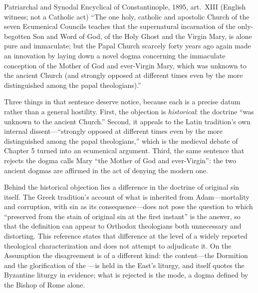 \begin{studybox}{Patriarchal and Synodal Encyclical of Constantinople,
1895, art.~XIII (English witness; not a Catholic act)}
``The one holy, catholic and apostolic Church of the seven Ecumenical
Councils teaches that the supernatural incarnation of the only-begotten
Son and Word of God, of the Holy Ghost and the Virgin Mary, is alone pure
and immaculate; but the Papal Church scarcely forty years ago again made
an innovation by laying down a novel dogma concerning the immaculate
conception of the Mother of God and ever-Virgin Mary, which was unknown
to the ancient Church (and strongly opposed at different times even by
the more distinguished among the papal theologians).''
\end{studybox}

Three things in that sentence deserve notice, because each is a precise
datum rather than a general hostility. First, the objection is
\emph{historical}: the doctrine ``was unknown to the ancient Church.''
Second, it appeals to the Latin tradition's own internal
dissent---``strongly opposed at different times even by the more
distinguished among the papal theologians,'' which is the medieval debate
of Chapter 5 turned into an ecumenical argument. Third, the same sentence
that rejects the dogma calls Mary ``the Mother of God and ever-Virgin'':
the two ancient dogmas are affirmed in the act of denying the modern one.

Behind the historical objection lies a difference in the doctrine of
original sin itself. The Greek tradition's account of what is inherited
from Adam---mortality and corruption, with sin as its consequence---does
not pose the question to which ``preserved from the stain of original
sin at the first instant'' is the answer, so that the definition can
appear to Orthodox theologians both unnecessary and distorting. This
reference states that difference at the level of a widely reported
theological characterization and does not attempt to adjudicate
it. On the Assumption the disagreement is of a
different kind: the content---the Dormition and the glorification of the
---is held in the East's liturgy, and  itself
quotes the Byzantine liturgy in evidence; what is rejected is the mode,
a dogma defined by the Bishop of Rome alone.

